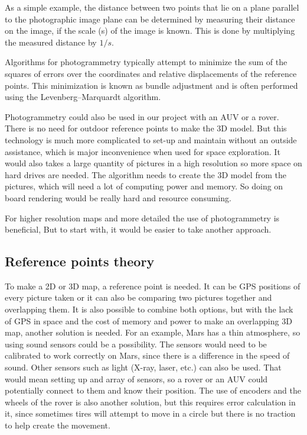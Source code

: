 As a simple example, the distance between two points that lie on a plane parallel to the photographic image plane can be determined by measuring their distance on the image, if the scale (s) of the image is known. This is done by multiplying the measured distance by $1/s$\cite{photo}.

Algorithms for photogrammetry typically attempt to minimize the sum of the squares of errors over the coordinates and relative displacements of the reference points. This minimization is known as bundle adjustment and is often performed using the Levenberg–Marquardt algorithm\cite{photo}.

Photogrammetry could also be used in our project with an AUV or a rover. There is no need for outdoor reference points to make the 3D model. But this technology is much more complicated to set-up and maintain without an outside assistance, which is major inconvenience when used for space exploration. It would also takes a large quantity of pictures in a high resolution so more space on hard drives are needed. The algorithm needs to create the 3D model from the pictures, which will need a lot of computing power and memory. So doing on board rendering would be really hard and resource consuming.

For higher resolution maps and more detailed the use of photogrammetry is beneficial, But to start with, it would be easier to take another approach. %

\subsection{Reference points theory}

To make a 2D or 3D map, a reference point is needed. It can be GPS positions of every picture taken or it can also be comparing two pictures together and overlapping them. It is also possible to combine both options, but with the lack of GPS in space and the cost of memory and power to make an overlapping 3D map, another solution is needed. For an example, Mars has a thin atmosphere, so using sound sensors could be a possibility. The sensors would need to be calibrated to work correctly on Mars, since there is a difference in the speed of sound. Other sensors such as light (X-ray, laser, etc.) can also be used. That would mean setting up and array of sensors, so a rover or an AUV could potentially connect to them and know their position. The use of encoders and the wheels of the rover is also another solution, but this requires error calculation in it, since sometimes tires will attempt to move in a circle but there is no traction to help create the movement\cite{reference}.

